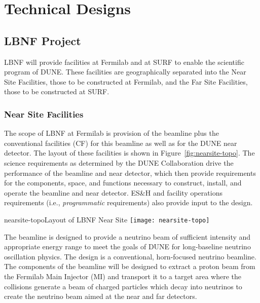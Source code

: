 
\chapter{Technical Designs}
\label{v1ch:tech-designs}
 
 
 
\section{LBNF Project}
 
LBNF will provide facilities at Fermilab and at SURF to enable the scientific program of DUNE. These facilities are geographically separated into the Near Site Facilities, those to be constructed at Fermilab, and the Far Site Facilities, those to be constructed at SURF. %
 
\subsection{Near Site Facilities}
 
The scope of LBNF at Fermilab is provision of the beamline plus the conventional facilities (CF) for this beamline as well as for the DUNE near detector. The layout of these facilities is shown in Figure~\ref{fig:nearsite-topo}. The science requirements as determined by the DUNE
Collaboration drive the performance of the beamline and near detector, which then provide requirements for the components, space, and functions necessary to construct, install, and operate the beamline and near detector. ES\&H and facility operations requirements (i.e., \textit{programmatic} requirements) also provide input to the design.
 
\begin{cdrfigure}{nearsite-topo}{Layout of LBNF Near Site}
  \texttt{[image: nearsite-topo]}
\end{cdrfigure}
 
 
The beamline is designed to provide a neutrino beam of sufficient intensity and appropriate energy range to meet the goals of DUNE for long-baseline neutrino oscillation physics. The design is a conventional, horn-focused neutrino beamline. The components of the beamline will be designed to extract a proton beam from the Fermilab Main Injector (MI) and transport it to a target area where the collisions generate a beam of charged particles which decay into neutrinos to create the neutrino beam aimed at the near and far detectors.
 
